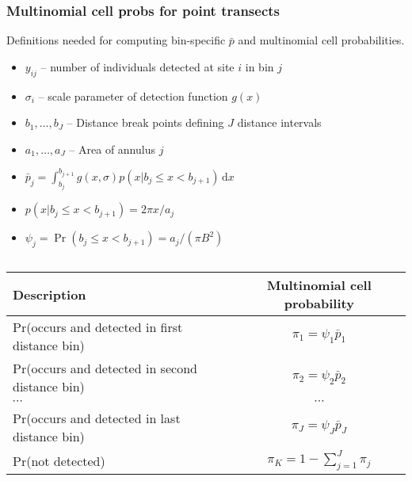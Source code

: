 \documentclass[color=usenames,dvipsnames]{beamer}\usepackage[]{graphicx}\usepackage[]{color}
\begin{document}
\begin{frame}
  \frametitle{Multinomial cell probs for point transects}
  \small
  Definitions needed for computing \alert{bin-specific} $\bar{p}$ and
  multinomial cell probabilities. 
  \begin{itemize}
    \small
    \setlength\itemsep{1pt}
    \item $y_{ij}$ -- number of individuals detected at site $i$ in bin $j$
    \item $\sigma_i$ -- scale parameter of detection function $g(x)$
    \item $b_1, \dots, b_J$ -- Distance break points defining $J$
      distance intervals
    \item $a_1, \dots, a_J$ -- Area of annulus $j$
    \item $\bar{p}_j = \int_{b_j}^{b_{j+1}} g(x,\sigma)p(x|b_j\le x<b_{j+1})\, \mathrm{d}x$
    \item $p(x|b_j\le x<b_{j+1}) = 2\pi x/a_j$
    \item $\psi_j=\Pr(b_j\le x<b_{j+1})=a_j/(\pi B^2)$
  \end{itemize}
  \pause \vfill
  \footnotesize
  \begin{columns}
    \column{0.9\paperwidth}
    \begin{tabular}{lc}
      \hline
      \centering
      Description                       & Multinomial cell probability \\
      \hline
      Pr(occurs and detected in first distance bin)  & $\pi_1 = \psi_1\bar{p}_1$   \\
      Pr(occurs and detected in second distance bin)  & $\pi_2 = \psi_2\bar{p}_2$   \\
      {\centering $\cdots$}             & $\cdots$                     \\
      Pr(occurs and detected in last distance bin)  & $\pi_J = \psi_J\bar{p}_J$   \\
      Pr(not detected)                  & $\pi_{K} = 1-\sum_{j=1}^J \pi_j$          \\
      \hline
    \end{tabular}
  \end{columns}
\end{frame}
\end{document}
